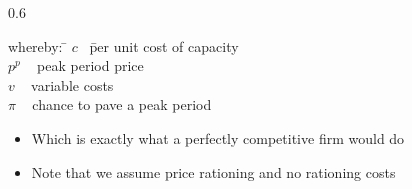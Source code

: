 \begin{frame}
\begin{columns}
\begin{column} {0.6\textwidth}
{\small
\begin{tabbing}
whereby: \= $c$ \  \= per unit cost of capacity \\
\> $p^p$   \    \> peak period price  \\
\> $v$    \   \> variable costs \\
\> $\pi$    \    \> chance to pave a peak period
\end{tabbing}}

\begin{itemize}
\item Which is exactly what a perfectly competitive firm would do
\end {itemize}

\begin{itemize}
\item Note that we assume price rationing and no rationing costs
\end {itemize}

\end{column}
\end{columns}

							\end{frame}
